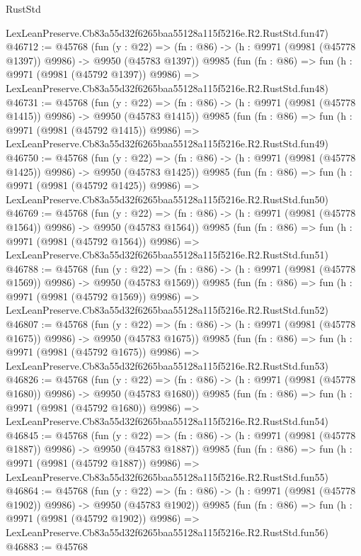 \begin{lexlean}{RustStd}
\begin{coremodule}
    LexLeanPreserve.Cb83a55d32f6265baa55128a115f5216e.R2.RustStd.fun47)
@46712 := @45768
    (fun (y : @22) =>
    (fn : @86) -> (h : @9971 (@9981 (@45778 @1397)) @9986) -> @9950 (@45783 @1397))
    @9985
    (fun (fn : @86) =>
    fun (h : @9971 (@9981 (@45792 @1397)) @9986) =>
    LexLeanPreserve.Cb83a55d32f6265baa55128a115f5216e.R2.RustStd.fun48)
@46731 := @45768
    (fun (y : @22) =>
    (fn : @86) -> (h : @9971 (@9981 (@45778 @1415)) @9986) -> @9950 (@45783 @1415))
    @9985
    (fun (fn : @86) =>
    fun (h : @9971 (@9981 (@45792 @1415)) @9986) =>
    LexLeanPreserve.Cb83a55d32f6265baa55128a115f5216e.R2.RustStd.fun49)
@46750 := @45768
    (fun (y : @22) =>
    (fn : @86) -> (h : @9971 (@9981 (@45778 @1425)) @9986) -> @9950 (@45783 @1425))
    @9985
    (fun (fn : @86) =>
    fun (h : @9971 (@9981 (@45792 @1425)) @9986) =>
    LexLeanPreserve.Cb83a55d32f6265baa55128a115f5216e.R2.RustStd.fun50)
@46769 := @45768
    (fun (y : @22) =>
    (fn : @86) -> (h : @9971 (@9981 (@45778 @1564)) @9986) -> @9950 (@45783 @1564))
    @9985
    (fun (fn : @86) =>
    fun (h : @9971 (@9981 (@45792 @1564)) @9986) =>
    LexLeanPreserve.Cb83a55d32f6265baa55128a115f5216e.R2.RustStd.fun51)
@46788 := @45768
    (fun (y : @22) =>
    (fn : @86) -> (h : @9971 (@9981 (@45778 @1569)) @9986) -> @9950 (@45783 @1569))
    @9985
    (fun (fn : @86) =>
    fun (h : @9971 (@9981 (@45792 @1569)) @9986) =>
    LexLeanPreserve.Cb83a55d32f6265baa55128a115f5216e.R2.RustStd.fun52)
@46807 := @45768
    (fun (y : @22) =>
    (fn : @86) -> (h : @9971 (@9981 (@45778 @1675)) @9986) -> @9950 (@45783 @1675))
    @9985
    (fun (fn : @86) =>
    fun (h : @9971 (@9981 (@45792 @1675)) @9986) =>
    LexLeanPreserve.Cb83a55d32f6265baa55128a115f5216e.R2.RustStd.fun53)
@46826 := @45768
    (fun (y : @22) =>
    (fn : @86) -> (h : @9971 (@9981 (@45778 @1680)) @9986) -> @9950 (@45783 @1680))
    @9985
    (fun (fn : @86) =>
    fun (h : @9971 (@9981 (@45792 @1680)) @9986) =>
    LexLeanPreserve.Cb83a55d32f6265baa55128a115f5216e.R2.RustStd.fun54)
@46845 := @45768
    (fun (y : @22) =>
    (fn : @86) -> (h : @9971 (@9981 (@45778 @1887)) @9986) -> @9950 (@45783 @1887))
    @9985
    (fun (fn : @86) =>
    fun (h : @9971 (@9981 (@45792 @1887)) @9986) =>
    LexLeanPreserve.Cb83a55d32f6265baa55128a115f5216e.R2.RustStd.fun55)
@46864 := @45768
    (fun (y : @22) =>
    (fn : @86) -> (h : @9971 (@9981 (@45778 @1902)) @9986) -> @9950 (@45783 @1902))
    @9985
    (fun (fn : @86) =>
    fun (h : @9971 (@9981 (@45792 @1902)) @9986) =>
    LexLeanPreserve.Cb83a55d32f6265baa55128a115f5216e.R2.RustStd.fun56)
@46883 := @45768

\end{coremodule}
\end{lexlean}
